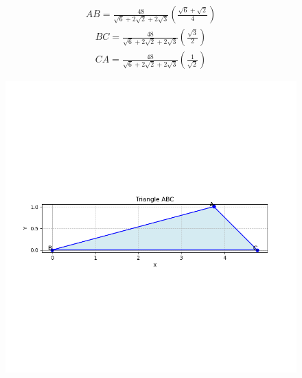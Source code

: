 \documentclass[journal]{IEEEtran}
\begin{document}
\begin{align}
    AB = \frac{48}{\sqrt{6}+2\sqrt{2}+2\sqrt{3}}(\frac{\sqrt{6}+\sqrt{2}}{4})
\end{align}
\begin{align}
    BC = \frac{48}{\sqrt{6}+2\sqrt{2}+2\sqrt{3}}(\frac{\sqrt{3}}{2})
\end{align}
\begin{align}
    CA = \frac{48}{\sqrt{6}+2\sqrt{2}+2\sqrt{3}}(\frac{1}{\sqrt{2}})
\end{align}
\begin{figure}[h!]
   \centering
   \includegraphics[width=\linewidth]{figs/Figure_1.png}
   \caption{}
   \label{stemplot}
\end{figure}
\end{document}
